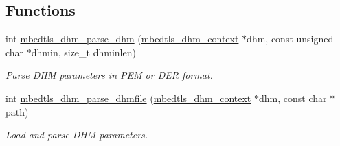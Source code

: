 \subsection*{Functions}
\begin{DoxyCompactItemize}
\item 
int \hyperlink{group__x509__module_gae1bf556398cac1761aa2041908e9f619}{mbedtls\-\_\-dhm\-\_\-parse\-\_\-dhm} (\hyperlink{structmbedtls__dhm__context}{mbedtls\-\_\-dhm\-\_\-context} $\ast$dhm, const unsigned char $\ast$dhmin, size\-\_\-t dhminlen)
\begin{DoxyCompactList}\small\item\em Parse D\-H\-M parameters in P\-E\-M or D\-E\-R format. \end{DoxyCompactList}\item 
int \hyperlink{group__x509__module_gae2f53ca5e795b7e8674f092777a5a828}{mbedtls\-\_\-dhm\-\_\-parse\-\_\-dhmfile} (\hyperlink{structmbedtls__dhm__context}{mbedtls\-\_\-dhm\-\_\-context} $\ast$dhm, const char $\ast$path)
\begin{DoxyCompactList}\small\item\em Load and parse D\-H\-M parameters. \end{DoxyCompactList}\end{DoxyCompactItemize}
